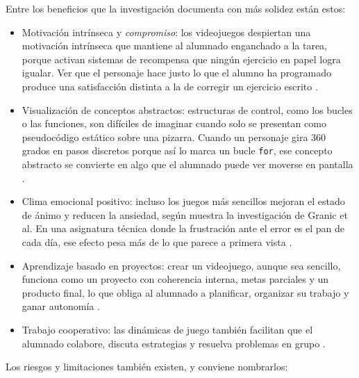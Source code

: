 \documentclass[a4paper,12pt]{article}
\begin{document}
Entre los beneficios que la investigación documenta con más solidez están estos:

\begin{itemize}
  \item Motivación intrínseca y \textit{compromiso}: los videojuegos despiertan una motivación intrínseca que mantiene al alumnado enganchado a la tarea, porque activan sistemas de recompensa que ningún ejercicio en papel logra igualar. Ver que el personaje hace justo lo que el alumno ha programado produce una satisfacción distinta a la de corregir un ejercicio escrito \citep{granic2014benefits, malone1981intrinsic}.

  \item Visualización de conceptos abstractos: estructuras de control, como los bucles o las funciones, son difíciles de imaginar cuando solo se presentan como pseudocódigo estático sobre una pizarra. Cuando un personaje gira 360 grados en pasos discretos porque así lo marca un bucle \texttt{for}, ese concepto abstracto se convierte en algo que el alumnado puede ver moverse en pantalla \citep{papastergiou2009digital, gee2003games}.

  \item Clima emocional positivo: incluso los juegos más sencillos mejoran el estado de ánimo y reducen la ansiedad, según muestra la investigación de Granic et al. En una asignatura técnica donde la frustración ante el error es el pan de cada día, ese efecto pesa más de lo que parece a primera vista \citep{granic2014benefits}.

  \item Aprendizaje basado en proyectos: crear un videojuego, aunque sea sencillo, funciona como un proyecto con coherencia interna, metas parciales y un producto final, lo que obliga al alumnado a planificar, organizar su trabajo y ganar autonomía \citep{wouters2013meta, kirriemuir2004literature}.

  \item Trabajo cooperativo: las dinámicas de juego también facilitan que el alumnado colabore, discuta estrategias y resuelva problemas en grupo \citep{granic2014benefits}.
\end{itemize}

Los riesgos y limitaciones también existen, y conviene nombrarlos:
\end{document}
